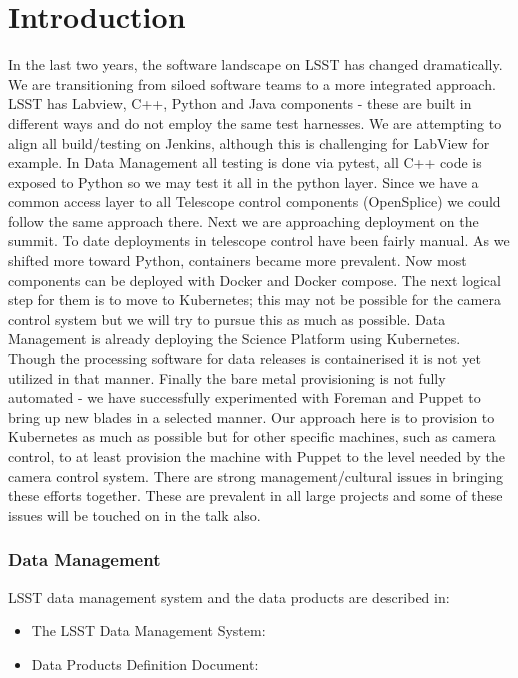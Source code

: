 \section{Introduction}


In the last two years, the software landscape on LSST has changed dramatically.  We are transitioning from siloed software teams to a  more integrated approach.  LSST has Labview, C++, Python and Java components - these are built in different ways and do not employ the same test harnesses. We are attempting to align all build/testing on Jenkins, although this is challenging for LabView for example. In Data Management all testing is done via pytest, all C++ code is exposed to Python so we may test it all in the python layer.  Since we have a common access layer to all Telescope control components (OpenSplice) we could follow the same approach there.
Next we are approaching deployment on the summit. To date deployments in telescope control have been fairly manual. As we shifted more toward Python, containers became more prevalent. Now most components can be deployed with Docker and Docker compose. The next logical step for them is to move to Kubernetes; this may not be possible for the camera control system but we will try to pursue this as much as possible. Data Management is already deploying the Science Platform using Kubernetes. Though the processing software for data releases is containerised it is not yet utilized in that manner.
Finally the bare metal provisioning is not fully automated - we have successfully experimented with Foreman and Puppet to bring up new blades in a selected manner. Our approach here is to provision to Kubernetes as much as possible but for other specific machines, such as camera control, to at least provision the machine with Puppet to the level needed by the camera control system.
There are strong management/cultural issues in bringing these efforts together. These are prevalent in all large projects and some of these issues will be touched on in the talk also.

\subsubsection{Data Management}

LSST data management system and the data products are described in:

\begin{itemize}
  \item The LSST Data Management System: \cite{2015arXiv151207914J}
  \item Data Products Definition Document: \cite{LSE-163}
\end{itemize}


